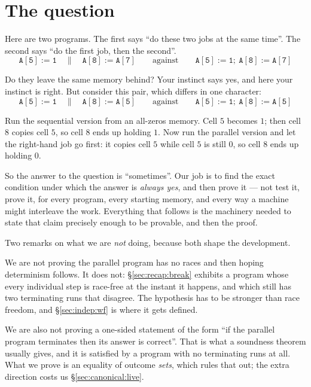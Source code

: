 \documentclass[11pt,a4paper]{article}
\theoremstyle{definition}
\theoremstyle{plain}
\theoremstyle{remark}
\begin{document}
\tableofcontents

\section{The question}\label{sec:question}

Here are two programs. The first says ``do these two jobs at the same time''. The second
says ``do the first job, then the second''.
\[
  \mathtt{A[5] := 1} \quad\|\quad \mathtt{A[8] := A[7]}
  \qquad\text{against}\qquad
  \mathtt{A[5] := 1};\ \mathtt{A[8] := A[7]}
\]

Do they leave the same memory behind? Your instinct says yes, and here your instinct is
right. But consider this pair, which differs in one character:
\[
  \mathtt{A[5] := 1} \quad\|\quad \mathtt{A[8] := A[5]}
  \qquad\text{against}\qquad
  \mathtt{A[5] := 1};\ \mathtt{A[8] := A[5]}
\]

Run the sequential version from an all-zeros memory. Cell $5$ becomes $1$; then cell $8$
copies cell $5$, so cell $8$ ends up holding $1$. Now run the parallel version and let the
right-hand job go first: it copies cell $5$ while cell $5$ is still $0$, so cell $8$ ends
up holding $0$.

So the answer to the question is ``sometimes''. Our job is to find the exact condition
under which the answer is \emph{always yes}, and then prove it --- not test it, prove it,
for every program, every starting memory, and every way a machine might interleave the
work. Everything that follows is the machinery needed to state that claim precisely enough
to be provable, and then the proof.

Two remarks on what we are \emph{not} doing, because both shape the development.

We are not proving the parallel program has no races and then hoping determinism follows.
It does not: \S\ref{sec:recap:break} exhibits a program whose every individual step is
race-free at the instant it happens, and which still has two terminating runs that
disagree. The hypothesis has to be stronger than race freedom, and \S\ref{sec:indep:wf} is
where it gets defined.

We are also not proving a one-sided statement of the form ``if the parallel program
terminates then its answer is correct''. That is what a soundness theorem usually gives,
and it is satisfied by a program with no terminating runs at all. What we prove is an
equality of outcome \emph{sets}, which rules that out; the extra direction costs us
\S\ref{sec:canonical:live}.
\end{document}
